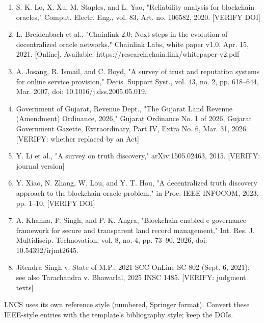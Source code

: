 \documentclass[10pt]{article}
\begin{document}
\begin{enumerate}
\item S. K. Lo, X. Xu, M. Staples, and L. Yao, "Reliability analysis for blockchain oracles," Comput. Electr. Eng., vol. 83, Art. no. 106582, 2020. [VERIFY DOI]
\item L. Breidenbach et al., "Chainlink 2.0: Next steps in the evolution of decentralized oracle networks," Chainlink Labs, white paper v1.0, Apr. 15, 2021. [Online]. Available: https://research.chain.link/whitepaper-v2.pdf
\item A. Josang, R. Ismail, and C. Boyd, "A survey of trust and reputation systems for online service provision," Decis. Support Syst., vol. 43, no. 2, pp. 618–644, Mar. 2007, doi: 10.1016/j.dss.2005.05.019.
\item Government of Gujarat, Revenue Dept., "The Gujarat Land Revenue (Amendment) Ordinance, 2026," Gujarat Ordinance No. 1 of 2026, Gujarat Government Gazette, Extraordinary, Part IV, Extra No. 6, Mar. 31, 2026. [VERIFY: whether replaced by an Act]
\item Y. Li et al., "A survey on truth discovery," arXiv:1505.02463, 2015. [VERIFY: journal version]
\item Y. Xiao, N. Zhang, W. Lou, and Y. T. Hou, "A decentralized truth discovery approach to the blockchain oracle problem," in Proc. IEEE INFOCOM, 2023, pp. 1–10. [VERIFY DOI]
\item A. Khanna, P. Singh, and P. K. Angra, "Blockchain-enabled e-governance framework for secure and transparent land record management," Int. Res. J. Multidiscip. Technovation, vol. 8, no. 4, pp. 73–90, 2026, doi: 10.54392/irjmt2645.
\item Jitendra Singh v. State of M.P., 2021 SCC OnLine SC 802 (Sept. 6, 2021); see also Tarachandra v. Bhawarlal, 2025 INSC 1485. [VERIFY: judgment texts]
\end{enumerate}
LNCS uses its own reference style (numbered, Springer format). Convert these IEEE-style entries with the template's bibliography style; keep the DOIs.
\end{document}
